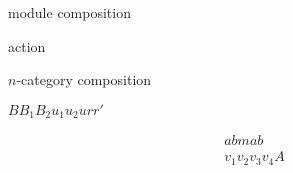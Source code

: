 \documentclass{amsart}
\begin{document}
\thispagestyle{empty}

module composition

action

$n$-category composition

$B B_1 B_2 u_1 u_2 u r r'$

\begin{align*}
abmab & \\
v_1 v_2 v_3 v_4 A
\end{align*}
\end{document}
